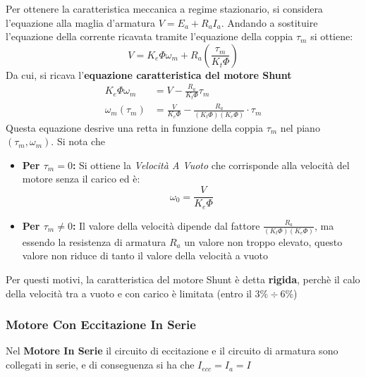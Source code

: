 ﻿\documentclass[11pt, a4paper]{article}
\begin{document}
Per ottenere la caratteristica meccanica a regime stazionario, si considera l'equazione alla maglia d'armatura $V = E_a + R_a I_a$. Andando a sostituire l'equazione della corrente ricavata tramite l'equazione della coppia $\tau_{m}$ si ottiene:
\[
    V = K_e \Phi \omega_m + R_a \left(\frac{\tau_m}{K_t \Phi}\right)
\]
Da cui, si ricava l'\textbf{equazione caratteristica del motore Shunt}
\begin{align*}
    K_e \Phi \omega_m &= V - \frac{R_a}{K_t \Phi} \tau_m\\
    \omega_m(\tau_m) &= \frac{V}{K_e \Phi} - \frac{R_a}{(K_t \Phi)(K_e \Phi)} \cdot \tau_m
\end{align*}
Questa equazione desrive una retta in funzione della coppia $\tau_{m}$ nel piano $(\tau_m, \omega_m)$. Si nota che
\begin{itemize}
    \item \textbf{Per $\tau_m = 0$:} Si ottiene la \textit{Velocità A Vuoto} che corrisponde alla velocità del motore senza il carico ed è:
    \[
        \omega_0 = \frac{V}{K_e \Phi}
    \]
    \item \textbf{Per $\tau_m \ne 0$:} Il valore della velocità dipende dal fattore $\frac{R_a}{(K_t \Phi)(K_e \Phi)}$, ma essendo la resistenza di armatura $R_{a}$ un valore non troppo elevato, questo valore non riduce di tanto il valore della velocità a vuoto
\end{itemize}
Per questi motivi, la caratteristica del motore Shunt è detta \textbf{rigida}, perchè il calo della velocità tra a vuoto e con carico è limitata (entro il $3\% \div 6\%$)
\newpage

\subsubsection{Motore Con Eccitazione In Serie}
Nel \textbf{Motore In Serie} il circuito di eccitazione e il circuito di armatura sono collegati in serie, e di conseguenza si ha che $I_{ecc} = I_{a} = I$
\end{document}
